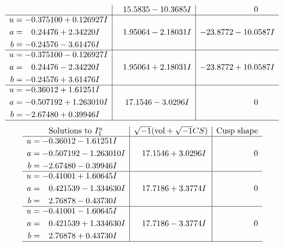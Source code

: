 \documentclass[1p]{elsarticle_modified}
\theoremstyle{definition}
\newcommand{\I}{\sqrt{-1}}
\begin{document}
$$\begin{array}{c|c|c}
 & \phantom{-}15.5835 - 10.3685 I & \phantom{-0.000000 } 0 \\ \hline\begin{aligned}
u &= -0.375100 + 0.126927 I \\
a &= \phantom{-}0.24476 + 2.34220 I \\
b &= -0.24576 - 3.61476 I\end{aligned}
 & \phantom{-}1.95064 - 2.18031 I & -23.8772 - 10.0587 I \\ \hline\begin{aligned}
u &= -0.375100 - 0.126927 I \\
a &= \phantom{-}0.24476 - 2.34220 I \\
b &= -0.24576 + 3.61476 I\end{aligned}
 & \phantom{-}1.95064 + 2.18031 I & -23.8772 + 10.0587 I \\ \hline\begin{aligned}
u &= -0.36012 + 1.61251 I \\
a &= -0.507192 + 1.263010 I \\
b &= -2.67480 + 0.39946 I\end{aligned}
 & \phantom{-}17.1546 - 3.0296 I & \phantom{-0.000000 } 0\\
 \hline 
 \end{array}$$\newpage$$\begin{array}{c|c|c}  
\text{Solutions to }I^u_{1}& \I (\text{vol} + \sqrt{-1}CS) & \text{Cusp shape}\\
 \hline 
\begin{aligned}
u &= -0.36012 - 1.61251 I \\
a &= -0.507192 - 1.263010 I \\
b &= -2.67480 - 0.39946 I\end{aligned}
 & \phantom{-}17.1546 + 3.0296 I & \phantom{-0.000000 } 0 \\ \hline\begin{aligned}
u &= -0.41001 + 1.60645 I \\
a &= \phantom{-}0.421539 - 1.334630 I \\
b &= \phantom{-}2.76878 - 0.43730 I\end{aligned}
 & \phantom{-}17.7186 + 3.3774 I & \phantom{-0.000000 } 0 \\ \hline\begin{aligned}
u &= -0.41001 - 1.60645 I \\
a &= \phantom{-}0.421539 + 1.334630 I \\
b &= \phantom{-}2.76878 + 0.43730 I\end{aligned}
 & \phantom{-}17.7186 - 3.3774 I & \phantom{-0.000000 } 0\\
 \hline 
 \end{array}$$\newpage\newpage\renewcommand{\arraystretch}{1}
\end{document}
